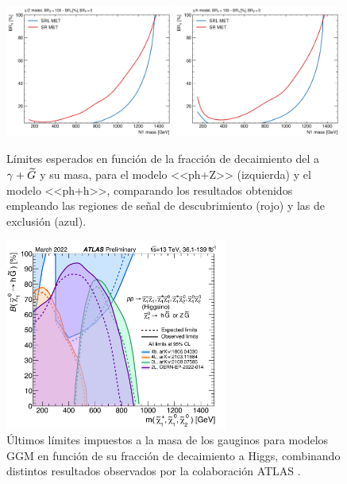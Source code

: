 \begin{figure}[ht!]
  \centering

    \includegraphics[width=0.49\textwidth]{images/analysis_EWK/plots_exp_excl_ewk/expected_limit_mass_vs_BR_yZ_cmp_SRL_vs_SR.png}
    \includegraphics[width=0.49\textwidth]{images/analysis_EWK/plots_exp_excl_ewk/expected_limit_mass_vs_BR_yh_cmp_SRL_vs_SR.png}

    \caption{Límites esperados en función de la fracción de decaimiento del \ninoone a $\gamma+\widetilde{G}$ y su masa, para el modelo <<ph+Z>> (izquierda) y el modelo <<ph+h>>, comparando los resultados obtenidos empleando las regiones de señal de descubrimiento (rojo) y las de exclusión (azul).}
    \label{fig:sre_ewk}

\end{figure}

\begin{figure}[ht!]
  \centering

    \includegraphics[width=0.65\textwidth]{images/analysis_EWK/actual_limits.png}

    \caption{Últimos límites impuestos a la masa de los gauginos para modelos GGM en función de su fracción de decaimiento a Higgs, combinando distintos resultados observados por la colaboración ATLAS \cite{susy_public_results}.}
    \label{fig:ewk_limits}

\end{figure}


